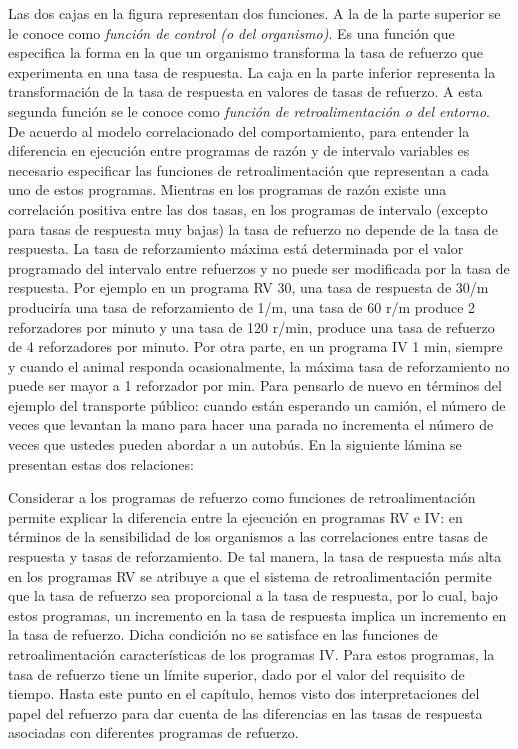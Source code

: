 \documentclass[
  letterpaper,
]{book}
\makeatletter
\newcommand*\pandocbounded[1]{%
  \sbox\pandoc@box{#1}%
  \Gscale@div\@tempa{\textheight}{\dimexpr\ht\pandoc@box+\dp\pandoc@box\relax}%
  \Gscale@div\@tempb{\linewidth}{\wd\pandoc@box}%
  \ifdim\@tempb\p@<\@tempa\p@\let\@tempa\@tempb\fi%
  \ifdim\@tempa\p@<\p@\scalebox{\@tempa}{\usebox\pandoc@box}%
  \else\usebox{\pandoc@box}%
  \fi%
}
\makeatother
\begin{document}
Las dos cajas en la figura representan dos funciones. A la de la parte
superior se le conoce como \emph{función de control (o del organismo)}.
Es una función que especifica la forma en la que un organismo transforma
la tasa de refuerzo que experimenta en una tasa de respuesta. La caja en
la parte inferior representa la transformación de la tasa de respuesta
en valores de tasas de refuerzo. A esta segunda función se le conoce
como \emph{función de retroalimentación o del entorno}.\\
De acuerdo al modelo correlacionado del comportamiento, para entender la
diferencia en ejecución entre programas de razón y de intervalo
variables es necesario especificar las funciones de retroalimentación
que representan a cada uno de estos programas. Mientras en los programas
de razón existe una correlación positiva entre las dos tasas, en los
programas de intervalo (excepto para tasas de respuesta muy bajas) la
tasa de refuerzo no depende de la tasa de respuesta. La tasa de
reforzamiento máxima está determinada por el valor programado del
intervalo entre refuerzos y no puede ser modificada por la tasa de
respuesta. Por ejemplo en un programa RV 30, una tasa de respuesta de
30/m produciría una tasa de reforzamiento de 1/m, una tasa de 60 r/m
produce 2 reforzadores por minuto y una tasa de 120 r/min, produce una
tasa de refuerzo de 4 reforzadores por minuto. Por otra parte, en un
programa IV 1 min, siempre y cuando el animal responda ocasionalmente,
la máxima tasa de reforzamiento no puede ser mayor a 1 reforzador por
min. Para pensarlo de nuevo en términos del ejemplo del transporte
público: cuando están esperando un camión, el número de veces que
levantan la mano para hacer una parada no incrementa el número de veces
que ustedes pueden abordar a un autobús. En la siguiente lámina se
presentan estas dos relaciones:

\pandocbounded{\texttt{[image: DraggedImage-4.png]}}

Considerar a los programas de refuerzo como funciones de
retroalimentación permite explicar la diferencia entre la ejecución en
programas RV e IV: en términos de la sensibilidad de los organismos a
las correlaciones entre tasas de respuesta y tasas de reforzamiento. De
tal manera, la tasa de respuesta más alta en los programas RV se
atribuye a que el sistema de retroalimentación permite que la tasa de
refuerzo sea proporcional a la tasa de respuesta, por lo cual, bajo
estos programas, un incremento en la tasa de respuesta implica un
incremento en la tasa de refuerzo. Dicha condición no se satisface en
las funciones de retroalimentación características de los programas IV.
Para estos programas, la tasa de refuerzo tiene un límite superior, dado
por el valor del requisito de tiempo. Hasta este punto en el capítulo,
hemos visto dos interpretaciones del papel del refuerzo para dar cuenta
de las diferencias en las tasas de respuesta asociadas con diferentes
programas de refuerzo.
\end{document}
